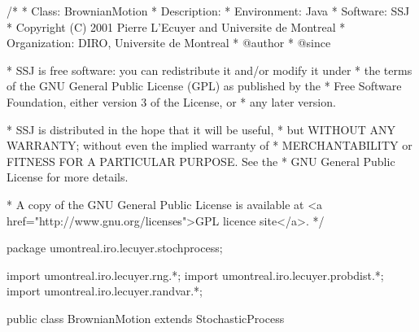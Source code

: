 \begin{code}
\begin{hide}
/*
 * Class:        BrownianMotion
 * Description:  
 * Environment:  Java
 * Software:     SSJ 
 * Copyright (C) 2001  Pierre L'Ecuyer and Universite de Montreal
 * Organization: DIRO, Universite de Montreal
 * @author       
 * @since

 * SSJ is free software: you can redistribute it and/or modify it under
 * the terms of the GNU General Public License (GPL) as published by the
 * Free Software Foundation, either version 3 of the License, or
 * any later version.

 * SSJ is distributed in the hope that it will be useful,
 * but WITHOUT ANY WARRANTY; without even the implied warranty of
 * MERCHANTABILITY or FITNESS FOR A PARTICULAR PURPOSE.  See the
 * GNU General Public License for more details.

 * A copy of the GNU General Public License is available at
   <a href="http://www.gnu.org/licenses">GPL licence site</a>.
 */
\end{hide}
package umontreal.iro.lecuyer.stochprocess;\begin{hide}
import umontreal.iro.lecuyer.rng.*;
import umontreal.iro.lecuyer.probdist.*;
import umontreal.iro.lecuyer.randvar.*;

\end{hide}

public class BrownianMotion extends StochasticProcess \begin{hide} {
    protected NormalGen    gen;
    protected double       mu,
                           sigma;
    // Precomputed values for standard BM
    protected double[]     mudt,
                           sigmasqrdt;
\end{hide}
\end{code}
